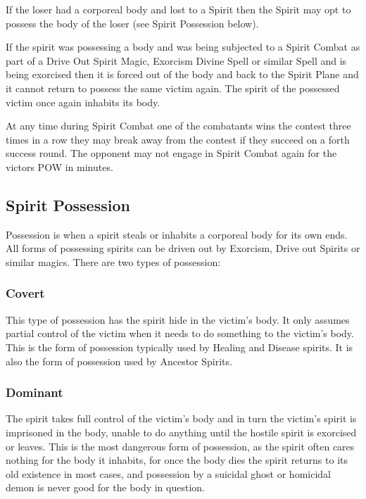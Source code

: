 \begin{rpg-list}
\item If the loser had a corporeal body and lost to a Spirit then the Spirit may opt to possess the body of the loser (see Spirit Possession below).
\item If the spirit was possessing a body and was being subjected to a Spirit Combat as part of a Drive Out Spirit Magic, Exorcism Divine Spell or similar Spell and is being exorcised then it is forced out of the body and back to the Spirit Plane and it cannot return to possess the same victim again. The spirit of the possessed victim once again inhabits its body.
\item At any time during Spirit Combat one of the combatants wins the contest three times in a row they may break away from the contest if they succeed on a forth success round. The opponent may not engage in Spirit Combat again for the victors POW in minutes.
\end{rpg-list}


\subsection{Spirit Possession}
Possession is when a spirit steals or inhabits a corporeal body for its own ends. All forms of possessing spirits can be driven out by Exorcism, Drive out Spirits or similar magics. There are two types of possession:

\subsubsection{Covert}
This type of possession has the spirit hide in the victim’s body. It only assumes partial control of the victim when it needs to do something to the victim’s body. This is the form of possession typically used by Healing and Disease spirits. It is also the form of possession used by Ancestor Spirits.

\subsubsection{Dominant}
The spirit takes full control of the victim’s body and in turn the victim’s spirit is imprisoned in the body, unable to do anything until the hostile spirit is exorcised or leaves. This is the most dangerous form of possession, as the spirit often cares nothing for the body it inhabits, for once the body dies the spirit returns to its old existence in most cases, and possession by a suicidal ghost or homicidal demon is never good for the body in question.


